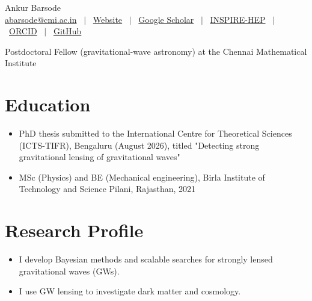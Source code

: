 \documentclass[a4paper,11pt]{article}
\begin{document}
\pagestyle{empty}

\vspace{0.45cm}

\Huge Ankur Barsode\\[7.5pt]
\small
\href{mailto:abarsode@cmi.ac.in}{abarsode@cmi.ac.in}
\ $|$ \
\href{https://anbarsode.github.io/}{Website}
\ $|$ \
\href{https://scholar.google.com/citations?user=HiMMiqgAAAAJ\&hl=en}{Google Scholar}
\ $|$ \
\href{https://inspirehep.net/authors/3081663}{INSPIRE-HEP}
\ $|$ \
\href{https://orcid.org/0009-0002-3054-7237}{ORCID}
\ $|$ \
\href{https://github.com/anbarsode}{GitHub}

\normalsize

Postdoctoral Fellow (gravitational-wave astronomy) at the Chennai Mathematical Institute

\section{Education}
\begin{itemize}[nosep,after=\strut,leftmargin=1em,itemsep=3pt]
\item[--] PhD thesis submitted to the International Centre for Theoretical Sciences (ICTS-TIFR), Bengaluru (August 2026), titled "Detecting strong gravitational lensing of gravitational waves"
\item[--] MSc (Physics) and BE (Mechanical engineering), Birla Institute of Technology and Science Pilani, Rajasthan, 2021
\end{itemize}

\section{Research Profile}
\begin{itemize}[nosep,after=\strut,leftmargin=1em,itemsep=3pt]
\item[--] I develop Bayesian methods and scalable searches for strongly lensed gravitational waves (GWs).
\item[--] I use GW lensing to investigate dark matter and cosmology.
\end{itemize}
\end{document}

